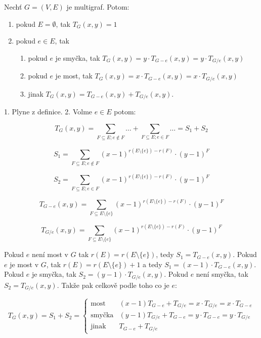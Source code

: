 \begin{veta}
	Nechť $G = (V,E)$ je multigraf. Potom:
	
	\begin{enumerate}
		\item pokud $E = \emptyset$, tak $T_{G}(x,y) = 1$
		\item pokud $e \in E$, tak
		\begin{enumerate}
			\item pokud $e$ je smyčka, tak $T_{G}(x,y) = y \cdot T_{G-e}(x,y) = y \cdot T_{G/e}(x,y)$
			\item pokud $e$ je most, tak $T_{G}(x,y) = x \cdot T_{G-e}(x,y) = x \cdot T_{G /e}(x,y)$
			\item jinak $T_{G}(x,y) = T_{G-e}(x,y) + T_{G/e}(x,y)$.
		\end{enumerate}
	\end{enumerate}
\end{veta}

\begin{dukaz}
	1. Plyne z definice. 2. Volme $e \in E$ potom:
	
	$$
	T_{G}(x,y) = \sum_{F \subseteq E; e \notin F} \dots + \sum_{F \subseteq E; e \in F} \dots = S_{1} + S_{2}
	$$
	
	$$
	S_{1} = \sum_{F \subseteq E; e \notin F}(x-1)^{r(E \setminus \{e\}) - r(F)} \cdot (y-1)^{F}
	$$
	
	$$
	S_{2} = \sum_{F \subseteq E; e \in F}(x-1)^{r(E \setminus \{e\}) - r(F)} \cdot (y-1)^{F}
	$$
	
	$$
	T_{G-e}(x,y) = \sum_{F \subseteq E \setminus \{e\}}(x-1)^{r(E \setminus \{e\}) - r(F)} \cdot (y-1)^{F}
	$$
	
	$$
	T_{G/e}(x,y) = \sum_{F \subseteq E \setminus \{e\}}(x-1)^{r(E \setminus \{e\}) - r(F)} \cdot (y-1)^{F}
	$$
	
	Pokud $e$ není most v $G$ tak $r(E) = r(E \setminus \{e\})$, tedy $S_{1} = T_{G-e}(x,y)$. Pokud $e$ je most v $G$, tak $r(E) = r(E \setminus \{e\}) + 1$ a tedy $S_{1} = (x-1) \cdot T_{G-e}(x,y)$. Pokud $e$ je smyčka, tak $S_{2} = (y-1) \cdot T_{G/e}(x,y)$. Pokud $e$ není smyčka, tak $S_{2} = T_{G/e}(x,y)$. Takže pak celkově podle toho co je $e$:
	
	$$
	T_{G}(x,y) = S_{1} + S_{2} =
	\left\{
	\begin{array}{ll}
		\text{most} & (x-1)T_{G-e} + T_{G/e} = x \cdot T_{G/e} = x \cdot T_{G-e} \\
		\text{smyčka} & (y-1)T_{G/e} + T_{G-e} = y \cdot T_{G-e} = y \cdot T_{G/e} \\
		\text{jinak} & T_{G-e} + T_{G/e}
	\end{array}
	\right.
	$$
\end{dukaz}

